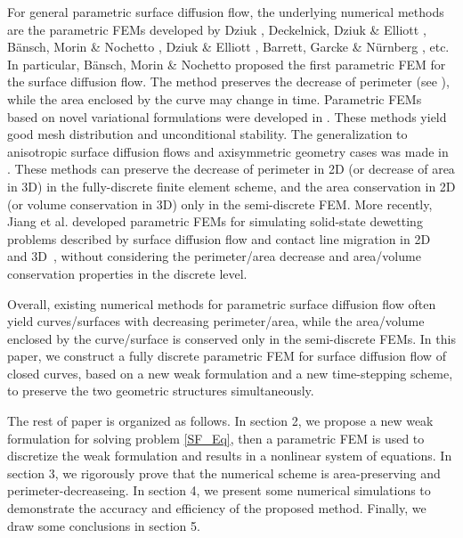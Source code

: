 \documentclass[review]{elsarticle}
\begin{document}
For general parametric surface diffusion flow, the underlying numerical methods are the parametric FEMs developed by Dziuk \cite{Dziuk90,Dziuk1999}, Deckelnick, Dziuk \& Elliott \cite{Deckelnick-Dziuk-Elliott-2005}, B\"ansch, Morin \& Nochetto \cite{Bansch05}, Dziuk \& Elliott \cite{Dziuk-Elliott-2007}, Barrett, Garcke \& N\"{u}rnberg \cite{Barrett07a,Barrett08b}, etc. 
In particular, B\"ansch, Morin \& Nochetto \cite{Bansch05} proposed the first parametric FEM for the surface diffusion flow. The method preserves the decrease of perimeter (see \cite[Theorem 2.1]{Bansch05}), while the area enclosed by the curve may change in time. Parametric FEMs based on novel variational formulations were developed in \cite{Barrett07a,Barrett08b,Barrett11,Barrett19b}. These methods yield good mesh distribution and unconditional stability. The generalization to anisotropic surface diffusion flows and axisymmetric geometry cases was made in \cite{Barrett08,Barrett08a,Barrett19}. 
These methods can preserve the decrease of perimeter in 2D (or decrease of area in 3D) in the fully-discrete finite element scheme, and the area conservation in 2D (or volume conservation in 3D) only in the semi-discrete FEM.
More recently, Jiang et al. developed parametric FEMs for simulating solid-state dewetting problems described by surface diffusion flow and contact line migration in 2D~\cite{Bao17} and 3D~\cite{Jiang19b}, without considering the perimeter/area decrease and area/volume conservation properties in the discrete level.

Overall, existing numerical methods for parametric surface diffusion flow often yield curves/surfaces with decreasing perimeter/area, while the area/volume enclosed by the curve/surface is conserved only in the semi-discrete FEMs. In this paper, we construct a fully discrete parametric FEM for surface diffusion flow of closed curves, based on a new weak formulation and a new time-stepping scheme, to preserve the two geometric structures simultaneously.

The rest of paper is organized as follows. In section 2, we propose a new weak formulation for solving  problem \eqref{SF_Eq}, then a parametric FEM is used to discretize the weak formulation and results in a nonlinear system of equations. In section 3, we rigorously prove that the numerical scheme is area-preserving and perimeter-decreaseing. In section 4, we present some numerical simulations to demonstrate the accuracy and efficiency of the proposed method. Finally, we draw some conclusions in section 5.
\end{document}
